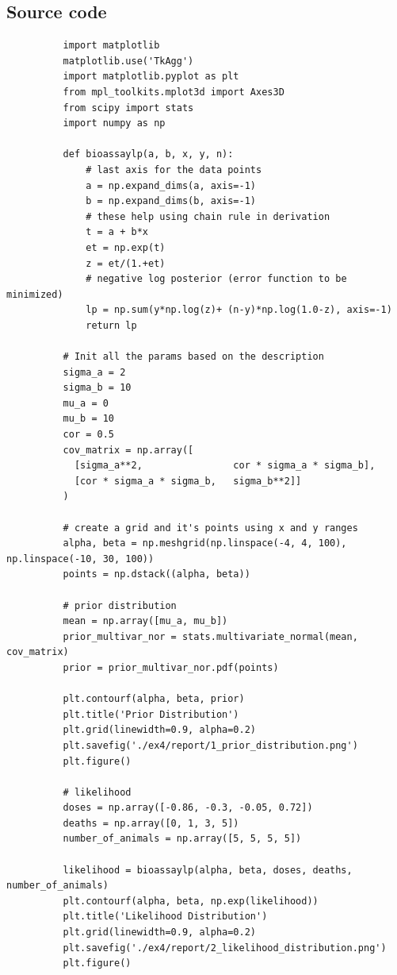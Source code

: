 \documentclass[11pt,a4paper,english]{article}
\begin{document}
      \begin{appendices}
        \section{Source code}
        \begin{verbatim}
          import matplotlib
          matplotlib.use('TkAgg')
          import matplotlib.pyplot as plt
          from mpl_toolkits.mplot3d import Axes3D
          from scipy import stats
          import numpy as np

          def bioassaylp(a, b, x, y, n):
              # last axis for the data points
              a = np.expand_dims(a, axis=-1)
              b = np.expand_dims(b, axis=-1)
              # these help using chain rule in derivation
              t = a + b*x
              et = np.exp(t)
              z = et/(1.+et)
              # negative log posterior (error function to be minimized)
              lp = np.sum(y*np.log(z)+ (n-y)*np.log(1.0-z), axis=-1)
              return lp

          # Init all the params based on the description
          sigma_a = 2
          sigma_b = 10
          mu_a = 0
          mu_b = 10
          cor = 0.5
          cov_matrix = np.array([
            [sigma_a**2,                cor * sigma_a * sigma_b],
            [cor * sigma_a * sigma_b,   sigma_b**2]]
          )

          # create a grid and it's points using x and y ranges
          alpha, beta = np.meshgrid(np.linspace(-4, 4, 100), np.linspace(-10, 30, 100))
          points = np.dstack((alpha, beta))

          # prior distribution
          mean = np.array([mu_a, mu_b])
          prior_multivar_nor = stats.multivariate_normal(mean, cov_matrix)
          prior = prior_multivar_nor.pdf(points)

          plt.contourf(alpha, beta, prior)
          plt.title('Prior Distribution')
          plt.grid(linewidth=0.9, alpha=0.2)
          plt.savefig('./ex4/report/1_prior_distribution.png')
          plt.figure()

          # likelihood
          doses = np.array([-0.86, -0.3, -0.05, 0.72])
          deaths = np.array([0, 1, 3, 5])
          number_of_animals = np.array([5, 5, 5, 5])

          likelihood = bioassaylp(alpha, beta, doses, deaths, number_of_animals)
          plt.contourf(alpha, beta, np.exp(likelihood))
          plt.title('Likelihood Distribution')
          plt.grid(linewidth=0.9, alpha=0.2)
          plt.savefig('./ex4/report/2_likelihood_distribution.png')
          plt.figure()


\end{verbatim}
\end{appendices}
\end{document}
